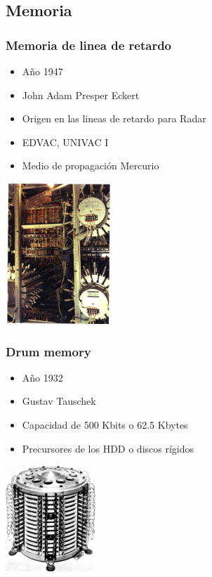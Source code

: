 \documentclass{beamer}
\begin{document}
\subsection{Memoria}
\begin{frame}
\frametitle{Memoria de linea de retardo}
\begin{minipage}[c]{7.5cm}
	\begin{itemize}
		\item Año 1947
		\item John Adam Presper Eckert
		\item Origen en las lineas de retardo para Radar
		\item EDVAC, UNIVAC I
		\item Medio de propagación Mercurio
	\end{itemize}
\end{minipage}
\begin{minipage}[c]{4cm}
	\begin{center}
		\includegraphics[width=4cm]{delay_line.png}
	\end{center}
\end{minipage}
\end{frame}

\begin{frame}
\frametitle{Drum memory}
\begin{minipage}[b]{7.5cm}
	\begin{itemize}
		\item Año 1932
		\item Gustav Tauschek
		\item Capacidad de 500 Kbits o 62.5 Kbytes
		\item Precursores de los HDD o discos rígidos
	\end{itemize}
\end{minipage}
\begin{minipage}[c]{4cm}
	\begin{center}
		\includegraphics[height=4cm]{Pamiec_bebnowa_1.jpg}
	\end{center}
\end{minipage}
\end{frame}
\end{document}
